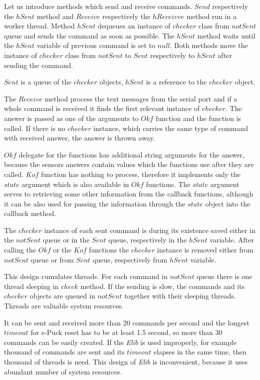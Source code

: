 \documentclass[12pt,notitlepage]{report}
\begin{document}
	Let us introduce methods which send and receive commands.
	$Send$ respectively  the $hSent$ method and $Receive$ respectively the $hReceivve$ method run in a worker thread. 
	Method $hSent$ dequeues an instance of $checker$ class from $notSent$ queue and
	sends the command as soon as possible. The $hSent$ method waits until the $hSent$ variable
	of previous command is set to $null$. Both methods move the instance
	of $checker$ class from $notSent$ to $Sent$ respectively to $hSent$ after sending the command.

	$Sent$ is a queue of the $checker$ objects, $hSent$ is a reference to the $checker$ object. 
	
	\label{p:oneargument}
	The $Receive$ method process the text messages from the serial port and if a whole command is received
	it finds the first relevant instance of  $checker$.
	The answer is passed as one of the arguments to $Okf$ function and the function is called.
	If there is no $checker$ instance, which carries the same type of command with received answer,
	the answer is thrown away.

	$Okf$ delegate for the functions has additional string arguments for the answer, because the sensors answers contain values
	which the functions use after they are called.
	$Kof$ function has nothing to process, therefore it implements only the $state$ argument 
	which is also available in $Okf$ functions. The $state$ argument serves to retrieving
	some other information from the callback functions, although it can be also used for
	passing the information through the $state$ object into the callback method.

	The $checker$ instance of each sent command is during its existence saved either in the $notSent$
	queue or in the $Sent$ queue, respectively in the $hSent$ variable.
	After calling the $Okf$ or the $Kof$ functions the $checker$ instance is removed either from $notSent$ queue
	or from $Sent$ queue, respectively from $hSent$ variable. 

	This design cumulates threads. For each command in $notSent$ queue there is 
	one thread sleeping in $check$ method. If the sending is slow, the commands and its $checker$ objects are queued in
	$notSent$ together with their sleeping threads. Threads are valuable system resources. 

	It can be sent and received more than 20 commands per second and the longest $timeout$ for 
	e-Puck reset has to be at least 1.5 second, so more than 30 commands can be easily created.
	If the {\it Elib} is used improperly, for example thousand of commands are sent and its $timeout$ elapses
	in the same time, then thousand of threads is need. This design of {\it Elib} is inconvenient, because
	it uses abundant number of system resources.
\end{document}
